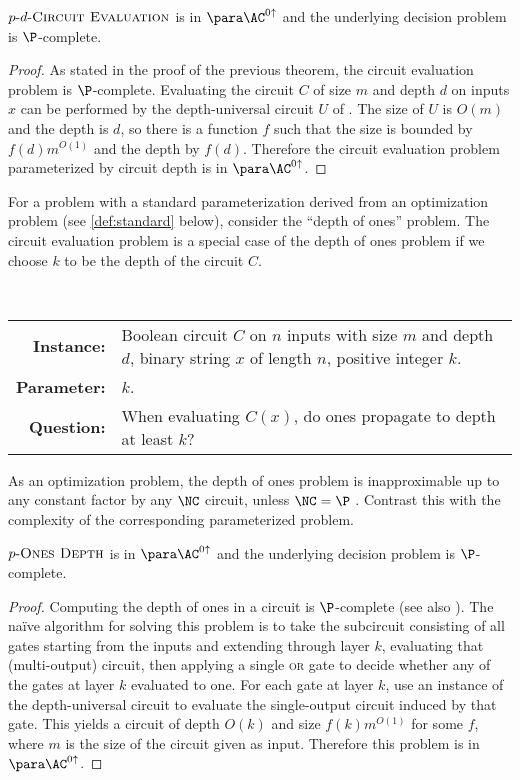 \documentclass{article}
\newcommand{\dash}{\textnormal{-}}
\begin{document}
\begin{theorem}\label{thm:cvpdepth}
  $p \dash d \dash \textsc{Circuit Evaluation}$ is in $\para \AC^{0 \uparrow}$ and the underlying decision problem is $\P$-complete.
\end{theorem}
\begin{proof}
  As stated in the proof of the previous theorem, the circuit evaluation problem is $\P$-complete.
  Evaluating the circuit $C$ of size $m$ and depth $d$ on inputs $x$ can be performed by the depth-universal circuit $U$ of \autocite{ch85}.
  The size of $U$ is $O(m)$ and the depth is $d$, so there is a function $f$ such that the size is bounded by $f(d) m^{O(1)}$ and the depth by $f(d)$.
  Therefore the circuit evaluation problem parameterized by circuit depth is in $\para \AC^{0 \uparrow}$.
\end{proof}

For a problem with a standard parameterization derived from an optimization problem (see \autoref{def:standard} below), consider the ``depth of ones'' problem.
The circuit evaluation problem is a special case of the depth of ones problem if we choose $k$ to be the depth of the circuit $C$.

\begin{definition}[$p \dash \textsc{Ones Depth}$]
  \mbox{} \\
  \begin{tabular}{r p{9.2cm}}
    \textbf{Instance:} & Boolean circuit $C$ on $n$ inputs with size $m$ and depth $d$, binary string $x$ of length $n$, positive integer $k$. \\
    \textbf{Parameter:} & $k$. \\
    \textbf{Question:} & When evaluating $C(x)$, do ones propagate to depth at least $k$?
  \end{tabular}
\end{definition}

As an optimization problem, the depth of ones problem is inapproximable up to any constant factor by any $\NC$ circuit, unless $\NC = \P$ \autocite{ks88}.
Contrast this with the complexity of the corresponding parameterized problem.

\begin{theorem}
  $p \dash \textsc{Ones Depth}$ is in $\para \AC^{0 \uparrow}$ and the underlying decision problem is $\P$-complete.
\end{theorem}
\begin{proof}
  Computing the depth of ones in a circuit is $\P$-complete \autocite{ks88} (see also \autocite[Problem~A.1.10]{ghr95}).
  The naïve algorithm for solving this problem is to take the subcircuit consisting of all gates starting from the inputs and extending through layer $k$, evaluating that (multi-output) circuit, then applying a single \textsc{or} gate to decide whether any of the gates at layer $k$ evaluated to one.
  For each gate at layer $k$, use an instance of the depth-universal circuit to evaluate the single-output circuit induced by that gate.
  This yields a circuit of depth $O(k)$ and size $f(k) m^{O(1)}$ for some $f$, where $m$ is the size of the circuit given as input.
  Therefore this problem is in $\para \AC^{0\uparrow}$.
\end{proof}
\end{document}
